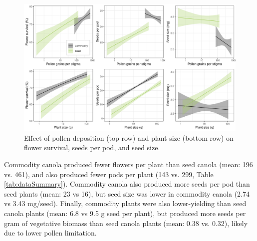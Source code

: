 \documentclass[12pt]{article} %
\begin{document}

\begin{figure}
    \centering
    \includegraphics[width=\textwidth,keepaspectratio=true]{../Figures/allSeeds.png}
    \caption{Effect of pollen deposition (top row) and plant size (bottom row) on flower survival, seeds per pod, and seed size.}
    \label{fig:allSeeds}
\end{figure}

Commodity canola produced fewer flowers per plant than seed canola (mean: 196 vs. 461), and also produced fewer pods per plant (143 vs. 299, Table \ref{tab:dataSummary}).
Commodity canola also produced more seeds per pod than seed plants (mean: 23 vs 16), but seed size was lower in commodity canola (2.74 vs 3.43 mg/seed). 
Finally, commodity plants were also lower-yielding than seed canola plants (mean: 6.8 vs 9.5 g seed per plant), but produced more seeds per gram of vegetative biomass than seed canola plants (mean: 0.38 vs. 0.32), likely due to lower pollen limitation.
\end{document}
